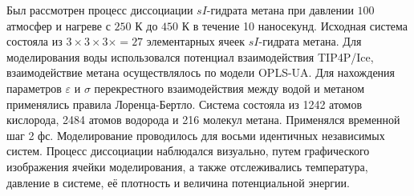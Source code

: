 Был рассмотрен процесс диссоциации $sI$-гидрата метана при давлении $100$ атмосфер и нагреве с $250$ К до $450$ К в течение 10 наносекунд. Исходная система состояла из $3\times 3\times 3\times=27$ элементарных ячеек $sI$-гидрата метана. Для моделирования воды использовался потенциал взаимодействия TIP4P/Ice, взаимодействие метана осуществлялось по модели OPLS-UA. Для нахождения параметров $\varepsilon$ и $\sigma$ перекрестного взаимодействия между водой и метаном применялись правила Лоренца-Бертло. Система состояла из 1242 атомов кислорода, 2484 атомов водорода и 216 молекул метана. Применялся временной шаг 2 фс. Моделирование проводилось для восьми идентичных независимых систем. Процесс диссоциации наблюдался визуально, путем графического изображения ячейки моделирования, а также отслеживались температура, давление в системе, её плотность и величина потенциальной энергии. 

